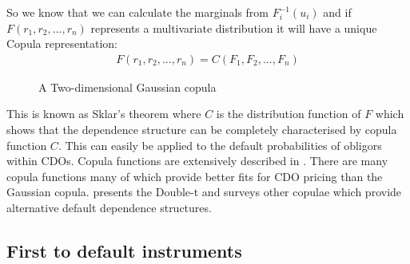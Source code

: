 So we know that we can calculate the marginals from $F^{-1}_i (u_i)$ and if $F(r_1, r_2, ..., r_n)$ represents a multivariate distribution it will have a unique Copula representation:
\begin{align}
F(r_1, r_2, ..., r_n) = C( F_1, F_2, ..., F_n) \nonumber
\end{align}

\begin{figure}
\centerline{}
\caption{\label{fig:copula}A Two-dimensional Gaussian copula}
\end{figure}

This is known as Sklar's theorem  where $C$ is the distribution function of $F$ which shows that the dependence structure can be completely characterised by copula function $C$. This can easily be applied to the default probabilities of obligors within CDOs. Copula functions are extensively described in \cite{nel2005,Sch2003}. There are many copula functions many of which provide better fits for CDO pricing than the Gaussian copula. \cite{hw2004} presents the Double-t and \cite{Sch2003} surveys other copulae which provide alternative default dependence structures.

\subsection{First to default instruments}

